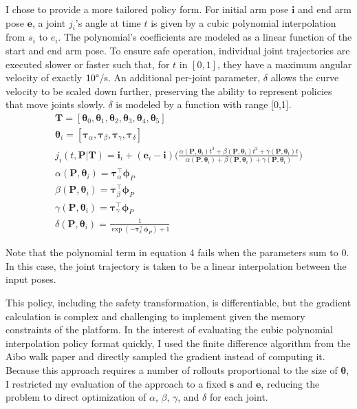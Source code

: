 \documentclass{article}
\newcommand{\thetab}{\bm{\theta}}
\newcommand{\phib}{\bm{\phi}}
\newcommand{\bP}{\bm{P}}
\newcommand{\be}{\bm{e}}
\newcommand{\taub}{\bm{\tau}}
\newcommand{\sumparams}{\alpha(\bP,\thetab_i) + \beta(\bP, \thetab_i) + \gamma(\bP, \thetab_i) }
\begin{document}
I chose to provide a more tailored policy form. For initial arm pose $\bm{i}$ and end arm pose $\bm{e}$, a joint $j_i$'s angle at time $t$ is given by a cubic polynomial interpolation from $s_i$ to $e_i$. The polynomial's coefficients are modeled as a linear function of the start and end arm pose. To ensure safe operation, individual joint trajectories are executed slower or faster such that, for $t$ in $[0,1]$, they have a maximum angular velocity of exactly $10\degree$/s. An additional per-joint parameter, $\delta$ allows the curve velocity to be scaled down further, preserving the ability to represent policies that move joints slowly. $\delta$ is modeled by a function with range [0,1].
\begin{gather}
	\bm{T} = [\thetab_0, \thetab_1, \thetab_2, \thetab_3, \thetab_4, \thetab_5]\\
	\thetab_i = [\taub_\alpha, \taub_\beta, \taub_\gamma, \taub_\delta] \\
	j_i(t, \bP | \bm{T}) = \bm{i}_i + (\be_i - \bm{i}) \bigg(\frac{\alpha(\bP,\thetab_i) t^3 + \beta(\bP, \thetab_i) t^2 + \gamma(\bP, \thetab_i) t}{\sumparams}\bigg)\\
	\alpha(\bP,\thetab_i) = \taub_\alpha^\top \phib_P\\
	\beta(\bP,\thetab_i) = \taub_\beta^\top \phib_P\\
	\gamma(\bP,\thetab_i) = \taub_\gamma^\top \phib_P\\	
	\delta(\bP,\thetab_i) = \frac{1}{\exp(-\taub_\delta^\top \phib_P) + 1}
\end{gather}

Note that the polynomial term in equation 4 fails when the parameters sum to 0. In this case, the joint trajectory is taken to be a linear interpolation between the input poses.

This policy, including the safety transformation, is differentiable, but the gradient calculation is complex and challenging to implement given the memory constraints of the platform. In the interest of evaluating the cubic polynomial interpolation policy format quickly, I used the finite difference algorithm from the Aibo walk paper and directly sampled the gradient instead of computing it. Because this approach requires a number of rollouts proportional to the size of $\thetab$,  I restricted my evaluation of the approach to a fixed $\bm{s}$ and $\bm{e}$, reducing the problem to direct optimization of $\alpha$, $\beta$, $\gamma$, and $\delta$ for each joint.
	

\end{document}
